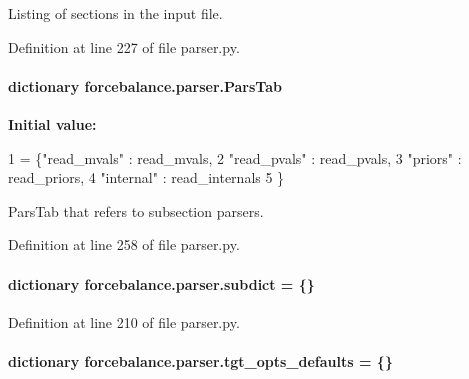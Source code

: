 Listing of sections in the input file. 



Definition at line 227 of file parser.\-py.

\hypertarget{namespaceforcebalance_1_1parser_a492c80e361e80dc74aebc13e7a072dfb}{
\paragraph[{Pars\-Tab}]{\setlength{\rightskip}{0pt plus 5cm}dictionary forcebalance.\-parser.\-Pars\-Tab}}\label{namespaceforcebalance_1_1parser_a492c80e361e80dc74aebc13e7a072dfb}
{\bfseries Initial value\-:}
\begin{DoxyCode}
1 = \{\textcolor{stringliteral}{"read\_mvals"} : read\_mvals,
2             \textcolor{stringliteral}{"read\_pvals"} : read\_pvals,
3             \textcolor{stringliteral}{"priors"}     : read\_priors,
4             \textcolor{stringliteral}{"internal"}   : read\_internals
5             \}
\end{DoxyCode}


Pars\-Tab that refers to subsection parsers. 



Definition at line 258 of file parser.\-py.

\hypertarget{namespaceforcebalance_1_1parser_abb7a7e9723de629aa97727a85bcdbad1}{
\paragraph[{subdict}]{\setlength{\rightskip}{0pt plus 5cm}dictionary forcebalance.\-parser.\-subdict = \{\}}}\label{namespaceforcebalance_1_1parser_abb7a7e9723de629aa97727a85bcdbad1}


Definition at line 210 of file parser.\-py.

\hypertarget{namespaceforcebalance_1_1parser_aff4922444f06b7334a0994a835607393}{
\paragraph[{tgt\-\_\-opts\-\_\-defaults}]{\setlength{\rightskip}{0pt plus 5cm}dictionary forcebalance.\-parser.\-tgt\-\_\-opts\-\_\-defaults = \{\}}}\label{namespaceforcebalance_1_1parser_aff4922444f06b7334a0994a835607393}


